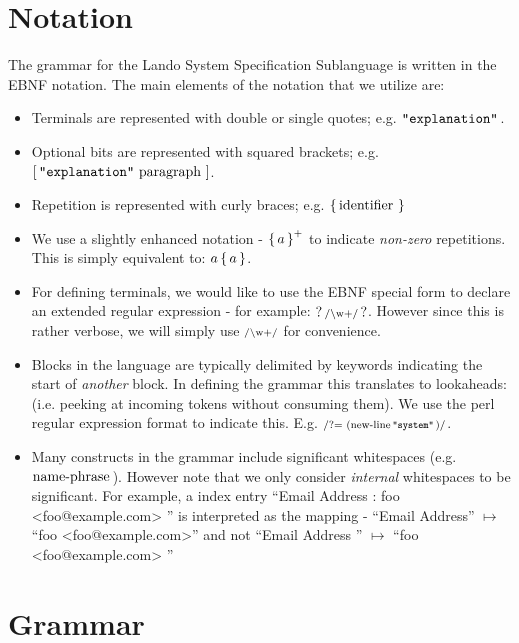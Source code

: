 \documentclass{article}
\begin{document}
\section{Notation}

The grammar for the Lando System Specification Sublanguage is written in the EBNF notation. The main elements of the notation that we utilize are:
\begin{itemize}
  \item Terminals are represented with double or single quotes; e.g. $\mathop{\texttt{"explanation"}}\,$.
  \item Optional bits are represented with squared brackets; e.g. $\mathop{\operatorname{[} \mathop{\mathop{\texttt{"explanation"}}\, \mathop{\textrm{paragraph}}\,} \operatorname{]}}$.
  \item Repetition is represented with curly braces; e.g. $\mathop{\operatorname{\{} \mathop{\textrm{identifier}}\, \operatorname{\}}}$
  \item We use a slightly enhanced notation - $\mathop{\operatorname{\{} a \operatorname{\}}^+}$ to indicate \emph{non-zero} repetitions. This is simply equivalent to: $a \mathop{\operatorname{\{} a \operatorname{\}}}$.
  \item For defining terminals, we would like to use the EBNF special form to declare an extended regular expression - for example: $\mathop{?\, \textrm{\scriptsize /\textbackslash w\\+/} \,?}$. However since this is rather verbose, we will simply use $\textrm{\scriptsize /\textrm{\textbackslash w\\+}/}$ for convenience.
  \item Blocks in the language are typically delimited by keywords indicating the start of \emph{another} block. In defining the grammar this translates to lookaheads: (i.e. peeking at incoming tokens without consuming them). We use the perl regular expression format to indicate this. E.g. $\textrm{\scriptsize /?= (\ensuremath{\mathop{\textrm{new-line}}}\,\ensuremath{\mathop{\texttt{"system"}}}\,)/}$.
  \item Many constructs in the grammar include significant whitespaces (e.g. $\mathop{\textrm{name-phrase}}\,$). However note that we only consider \emph{internal} whitespaces to be significant. For example, a index entry ``Email Address : foo <foo@example.com> '' is interpreted as the mapping - ``Email Address'' $\mapsto$ ``foo <foo@example.com>'' and not ``Email Address '' $\mapsto$ ``foo <foo@example.com> ''
\end{itemize}

\section{Grammar}
\end{document}
